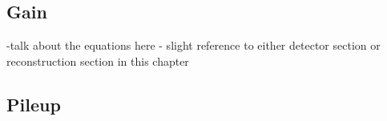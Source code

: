 \subsection{Gain}
\label{sub:gainerror}


-talk about the equations here - slight reference to either detector section or reconstruction section in this chapter



\subsection{Pileup}
\label{sub:pileuperror}


\cleardoublepage
